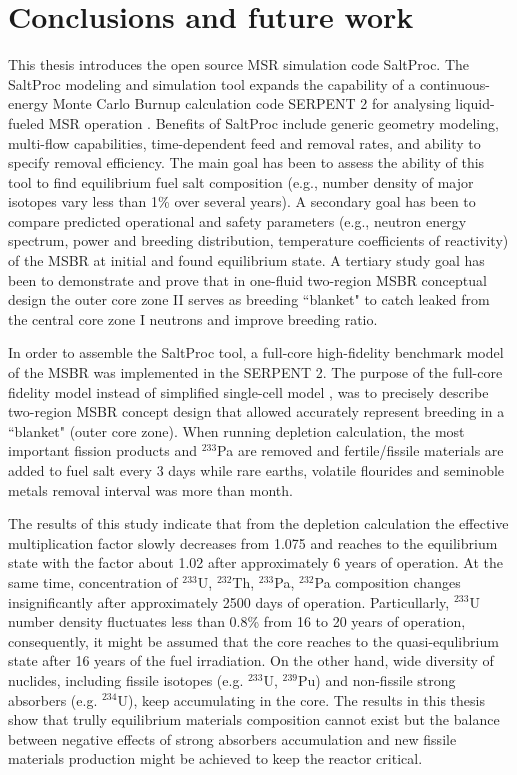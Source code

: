 \chapter[Conclusions and furture work]{Conclusions and future work}
This thesis introduces the open source \gls{MSR} simulation code SaltProc. The SaltProc modeling and simulation tool expands the capability of a continuous-energy Monte Carlo Burnup calculation code SERPENT 2 for analysing liquid-fueled \gls{MSR} operation \cite{andrei_rykhlevskii_arfc/saltproc:_2018}. Benefits of SaltProc include generic geometry modeling, multi-flow capabilities, time-dependent feed and removal rates, and ability to specify removal efficiency. The main goal has been to assess the ability of this tool to find equilibrium fuel salt composition (e.g., number density of major isotopes vary less than 1\% over several years). A secondary goal has been to compare predicted operational and safety parameters (e.g., neutron energy spectrum, power and breeding distribution, temperature coefficients of reactivity) of the \gls{MSBR} at initial and found equilibrium state. A tertiary study goal has been to demonstrate and prove that in one-fluid two-region \gls{MSBR} conceptual design the outer core zone II serves as breeding ``blanket" to catch leaked from the central core zone I neutrons and improve breeding ratio.

In order to assemble the SaltProc tool, a full-core high-fidelity benchmark model of the \gls{MSBR} was implemented in the SERPENT 2. The purpose of the full-core fidelity model instead of simplified single-cell model \cite{rykhlevskii_online_2017}, \cite{betzler_molten_2017} was to precisely describe two-region \gls{MSBR} concept design that allowed accurately represent breeding in a ``blanket" (outer core zone). When running depletion calculation, the most important fission products and $^{233}$Pa are removed and fertile/fissile materials are added to fuel salt every 3 days while rare earths, volatile flourides and seminoble metals removal interval was more than month. 

The results of this study indicate that from the depletion calculation the effective multiplication factor slowly decreases from 1.075 and reaches to the equilibrium state with the factor about 1.02 after approximately 6 years of operation. At the same time, concentration of $^{233}$U, $^{232}$Th, $^{233}$Pa, $^{232}$Pa composition changes insignificantly after approximately 2500 days of operation. Particullarly, $^{233}$U number density fluctuates less than 0.8\% from 16 to 20 years of operation, consequently, it might be assumed that the core reaches to the quasi-equlibrium state after 16 years of the fuel irradiation. On the other hand, wide diversity of nuclides, including fissile isotopes (e.g. $^{233}$U, $^{239}$Pu) and non-fissile strong absorbers (e.g. $^{234}$U), keep accumulating in the core. The results in this thesis show that trully equilibrium materials composition cannot exist but the balance between negative effects of strong absorbers accumulation and new fissile materials production might be achieved to keep the reactor critical.

